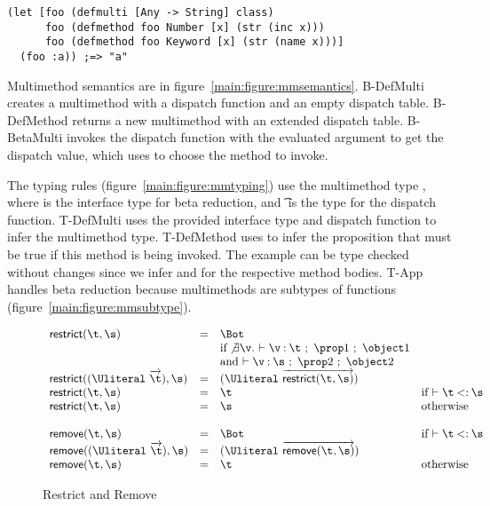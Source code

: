 
\begin{verbatim}
(let [foo (defmulti [Any -> String] class)
      foo (defmethod foo Number [x] (str (inc x)))
      foo (defmethod foo Keyword [x] (str (name x)))]
  (foo :a)) ;=> "a"
\end{verbatim}

Multimethod semantics are in figure~\ref{main:figure:mmsemantics}.
B-DefMulti creates a multimethod with a dispatch function and an empty dispatch table.
B-DefMethod returns a new multimethod with an extended dispatch table.
B-BetaMulti invokes the dispatch function with the evaluated argument to get the dispatch value,
which \getmethodliteral{} uses to choose the method to invoke.

The typing rules (figure~\ref{main:figure:mmtyping}) use the multimethod type {\MultiFntype{\s{}}{\t{}}}, 
where \s{} is the interface type for beta reduction, and \t{} is the type for
the dispatch function. T-DefMulti uses the provided interface type and dispatch function
to infer the multimethod type. T-DefMethod uses \isacompareliteral{} to infer the proposition
that must be true if this method is being invoked. The example can be type checked without
changes since we infer \isprop{\Number}{\x{}} and \isprop{\Keyword}{\x{}} for the respective
method bodies. T-App handles beta reduction because multimethods are subtypes of functions
(figure~\ref{main:figure:mmsubtype}).



{\footnotesize
\constantsemfigure{}

{}
}

\begin{figure}
  $$
\begin{array}{lllll}
  \restrictremovefigure{}
\end{array}
  $$
  \caption{Restrict and Remove}
  \label{main:figure:restrictremove}
\end{figure}
